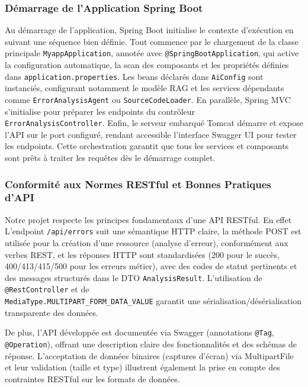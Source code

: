 \documentclass[12pt,a4paper]{report}
\begin{document}
	\subsubsection{Démarrage de l'Application Spring Boot}
	
	Au démarrage de l'application, Spring Boot initialise le contexte d'exécution en suivant une séquence bien définie. Tout commence par le chargement de la classe principale \verb|MyappApplication|, annotée avec \verb|@SpringBootApplication|, qui active la configuration automatique, la scan des composants et les propriétés définies dans \verb|application.properties|. Les beans déclarés dans \verb|AiConfig| sont instanciés, configurant notamment le modèle RAG et les services dépendants comme \verb|ErrorAnalysisAgent| ou \verb|SourceCodeLoader|. En parallèle, Spring MVC s'initialise pour préparer les endpoints du contrôleur \\ \verb|ErrorAnalysisController|. Enfin, le serveur embarqué Tomcat démarre et expose l'API sur le port configuré, rendant accessible l'interface Swagger UI pour tester les endpoints. Cette orchestration garantit que tous les services et composants sont prêts à traiter les requêtes dès le démarrage complet.
	
	\subsubsection{Conformité aux Normes RESTful et Bonnes Pratiques d'API}
	
	Notre projet respecte les principes fondamentaux d'une API RESTful. En effet L'endpoint \verb|/api/errors| suit une sémantique HTTP claire, la méthode POST est utilisée pour la création d'une ressource (analyse d'erreur), conformément aux verbes REST, et les réponses HTTP sont standardisées (200 pour le succès, 400/413/415/500 pour les erreurs métier), avec des codes de statut pertinents et des messages structurés dans le DTO \verb|AnalysisResult|. L'utilisation de \verb|@RestController| et de \\ \verb|MediaType.MULTIPART_FORM_DATA_VALUE| garantit une sérialisation/désérialisation transparente des données.
	
	De plus, l'API développée est documentée via Swagger (annotations \verb|@Tag|, \verb|@Operation|), offrant une description claire des fonctionnalités et des schémas de réponse. L'acceptation de données binaires (captures d'écran) via MultipartFile et leur validation (taille et type) illustrent également la prise en compte des contraintes RESTful sur les formats de données.
	
\end{document}
